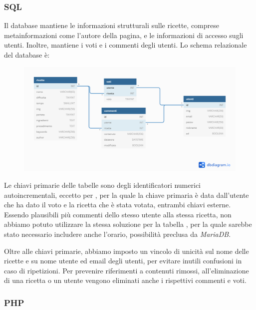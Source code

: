 \subsubsection{SQL}
Il database mantiene le informazioni strutturali sulle ricette, comprese metainformazioni come l'autore della pagina, e le informazioni di accesso sugli utenti.
Inoltre, mantiene i voti e i commenti degli utenti.
Lo schema relazionale del database è:

\begin{figure}[h!]
	\centering
	\includegraphics[width=18cm]{img/progettazione/schema-db}
\end{figure}

Le chiavi primarie delle tabelle sono degli identificatori numerici autoincrementali, eccetto per , per la quale la chiave primaria è data dall'utente che ha dato il voto e la ricetta che è stata votata, entrambi chiavi esterne.
Essendo plausibili più commenti dello stesso utente alla stessa ricetta, non abbiamo potuto utilizzare la stessa soluzione per la tabella , per la quale sarebbe stato necessario includere anche l'orario, possibilità preclusa da \textit{MariaDB}.

Oltre alle chiavi primarie, abbiamo imposto un vincolo di unicità sul nome delle ricette e su nome utente ed email degli utenti, per evitare inutili confusioni in caso di ripetizioni.
Per prevenire riferimenti a contenuti rimossi, all'eliminazione di una ricetta o un utente vengono eliminati anche i rispettivi commenti e voti.

\subsubsection{PHP}\label{subs:php}
